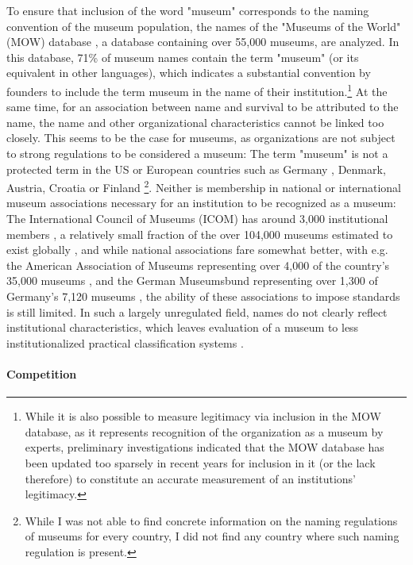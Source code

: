 \documentclass[12pt]{article}
\begin{document}
To ensure that inclusion of the word "museum" corresponds to the naming convention of the museum population, the names of the "Museums of the World" (MOW) database \parencite{deGruyter_2021_MOW}, a database containing over 55,000 museums, are analyzed.
In this database, 71\% of museum names contain the term "museum" (or its equivalent in other languages), which indicates a substantial convention by founders to include the term museum in the name of their institution.\footnote{While it is also possible to measure legitimacy via inclusion in the MOW database, as it represents recognition of the organization as a museum by experts, preliminary investigations indicated that the MOW database has been updated too sparsely in recent years for inclusion in it (or the lack therefore) to constitute an accurate measurement of an institutions' legitimacy.}
At the same time, for an association between name and survival to be attributed to the name, the name and other organizational characteristics cannot be linked too closely.
This seems to be the case for museums, as organizations are not subject to strong regulations to be considered a museum: 
The term "museum" is not a protected term in the US \parencite[p.205]{Moore_2022_best} or European countries such as Germany \parencite[p.4]{Museumsbund_ICOMDE_2006_standards}, Denmark, Austria, Croatia or Finland \parencite{EGMUS_2024_reports}\footnote{While I was not able to find concrete information on the naming regulations of museums for every country, I did not find any country where such naming regulation is present.}.
Neither is membership in national or international museum associations necessary for an institution to be recognized as a museum: 
The International Council of Museums (ICOM) has around 3,000 institutional members \parencite{ICOM_2020_report19}, a relatively small fraction of the over 104,000 museums estimated to exist globally \parencite{UNESCO_2021_covid}, and while national associations fare somewhat better, with e.g. the American Association of Museums representing over 4,000 of the country's 35,000 museums \parencite{LOC_2019_AAM}, and the German Museumsbund representing over 1,300 \parencite{Museumsbund_2024_mitgliedmuseen} of Germany's 7,120 museums \parencite{IMF_2024_museumsstatistik}, the ability of these associations to impose standards is still limited.
In such a largely unregulated field, names do not clearly reflect institutional characteristics, which leaves evaluation of a museum to less institutionalized practical classification systems \parencite{van_Venrooij_2018_fuzziness}.
\paragraph*{Competition}
\end{document}
